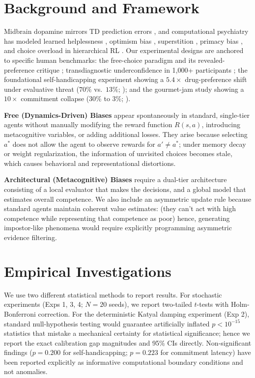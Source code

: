 \documentclass[conference]{IEEEtran}
\begin{document}
\section{Background and Framework}

Midbrain dopamine mirrors TD prediction errors \citep{schultz1997neural}, and computational psychiatry has modeled learned helplessness \citep{huys2009bayesian}, optimism bias \citep{lefebvre2017behavioural}, superstition \citep{bontrager2019superstition}, primacy bias \citep{nikishin2022primacy}, and choice overload in hierarchical RL \citep{nica2022paradox,dubey2022pursuit}. Our experimental designs are anchored to specific human benchmarks: the free-choice paradigm \citep{brehm1956postdecision} and its revealed-preference critique \citep{chen2010choice}; transdiagnostic underconfidence in 1{,}000+ participants \citep{katyal2025distorted}; the foundational self-handicapping experiment showing a $5.4\times$ drug-preference shift under evaluative threat ($70\%$ vs.\ $13\%$; \citet{berglas1978drug}); and the gourmet-jam study showing a $10\times$ commitment collapse ($30\%$ to $3\%$; \citet{iyengar2000choice}).

\textbf{Free (Dynamics-Driven) Biases} appear spontaneously in standard, single-tier agents without manually modifying the reward function $R(s,a)$, introducing metacognitive variables, or adding additional losses. They arise because selecting $a^*$ does not allow the agent to observe rewards for $a'\neq a^*$; under memory decay or weight regularization, the information of unvisited choices becomes stale, which causes behavioral and representational distortions.

\textbf{Architectural (Metacognitive) Biases} require a dual-tier architecture consisting of a local evaluator that makes the decisions, and a global model that estimates overall competence. We also include an asymmetric update rule because standard agents maintain coherent value estimates: (they can't act with high competence while representing that competence as poor) hence, generating impostor-like phenomena would require explicitly programming asymmetric evidence filtering.

\section{Empirical Investigations}

We use two different statistical methods to report results. For stochastic experiments (Exps 1, 3, 4; $N=20$ seeds), we report two-tailed $t$-tests with Holm-Bonferroni correction. For the deterministic Katyal damping experiment (Exp 2), standard null-hypothesis testing would guarantee artificially inflated $p<10^{-15}$ statistics that mistake a mechanical certainty for  statistical significance; hence we report the exact calibration gap magnitudes and 95\% CIs directly. Non-significant findings ($p = 0.200$ for self-handicapping; $p = 0.223$ for commitment latency) have been reported explicitly as informative computational boundary conditions and not anomalies.
\end{document}
